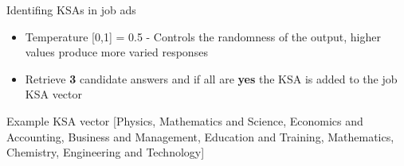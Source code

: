 \documentclass{beamer}
\begin{document}
\begin{frame}{Identifing KSAs in job ads}

\begin{itemize}
  \item Temperature [0,1] = 0.5 - Controls the randomness of the output, higher values produce more varied responses
  \item Retrieve \textbf{3} candidate answers and if all are \textbf{yes} the KSA is added to the job KSA vector
\end{itemize}

\begin{exampleblock}{Example KSA vector}
  [Physics, Mathematics and Science, Economics and Accounting, Business and Management, Education and Training, Mathematics, Chemistry, Engineering and Technology]
\end{exampleblock}
  
\end{frame}
\end{document}

